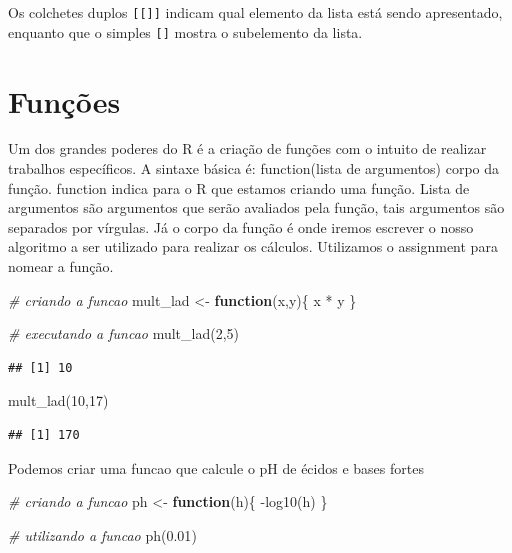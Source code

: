 \documentclass[
]{book}
\newenvironment{Shaded}{\begin{snugshade}}{\end{snugshade}}
\newcommand{\CommentTok}[1]{\textcolor[rgb]{0.56,0.35,0.01}{\textit{#1}}}
\newcommand{\ControlFlowTok}[1]{\textcolor[rgb]{0.13,0.29,0.53}{\textbf{#1}}}
\newcommand{\DecValTok}[1]{\textcolor[rgb]{0.00,0.00,0.81}{#1}}
\newcommand{\FloatTok}[1]{\textcolor[rgb]{0.00,0.00,0.81}{#1}}
\newcommand{\FunctionTok}[1]{\textcolor[rgb]{0.00,0.00,0.00}{#1}}
\newcommand{\NormalTok}[1]{#1}
\newcommand{\OtherTok}[1]{\textcolor[rgb]{0.56,0.35,0.01}{#1}}
\newcommand{\SpecialCharTok}[1]{\textcolor[rgb]{0.00,0.00,0.00}{#1}}
\begin{document}
Os colchetes duplos \texttt{{[}{[}{]}{]}} indicam qual elemento da lista está sendo apresentado, enquanto que o simples \texttt{{[}{]}} mostra o subelemento da lista.

\hypertarget{funuxe7uxf5es}{%
\section{Funções}\label{funuxe7uxf5es}}

Um dos grandes poderes do R é a criação de funções com o intuito de realizar trabalhos específicos. A sintaxe básica é: function(lista de argumentos) corpo da função. function indica para o R que estamos criando uma função. Lista de argumentos são argumentos que serão avaliados pela função, tais argumentos são separados por vírgulas. Já o corpo da função é onde iremos escrever o nosso algoritmo a ser utilizado para realizar os cálculos. Utilizamos o assignment para nomear a função.

\begin{Shaded}
\begin{Highlighting}[]
\CommentTok{\# criando a funcao}
\NormalTok{mult\_lad }\OtherTok{\textless{}{-}} \ControlFlowTok{function}\NormalTok{(x,y)\{}
\NormalTok{  x }\SpecialCharTok{*}\NormalTok{ y}
\NormalTok{\}}

\CommentTok{\# executando a funcao}
\FunctionTok{mult\_lad}\NormalTok{(}\DecValTok{2}\NormalTok{,}\DecValTok{5}\NormalTok{)}
\end{Highlighting}
\end{Shaded}

\begin{verbatim}
## [1] 10
\end{verbatim}

\begin{Shaded}
\begin{Highlighting}[]
\FunctionTok{mult\_lad}\NormalTok{(}\DecValTok{10}\NormalTok{,}\DecValTok{17}\NormalTok{)}
\end{Highlighting}
\end{Shaded}

\begin{verbatim}
## [1] 170
\end{verbatim}

Podemos criar uma funcao que calcule o pH de écidos e bases fortes

\begin{Shaded}
\begin{Highlighting}[]
\CommentTok{\# criando a funcao}
\NormalTok{ph }\OtherTok{\textless{}{-}} \ControlFlowTok{function}\NormalTok{(h)\{}
  \SpecialCharTok{{-}}\FunctionTok{log10}\NormalTok{(h)}
\NormalTok{\}}

\CommentTok{\# utilizando a funcao}
\FunctionTok{ph}\NormalTok{(}\FloatTok{0.01}\NormalTok{)}
\end{Highlighting}
\end{Shaded}
\end{document}
